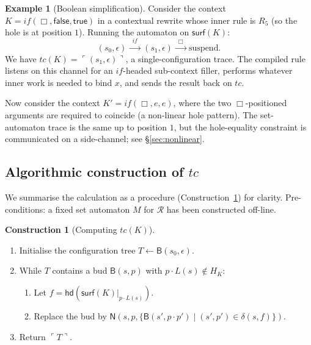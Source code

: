 \documentclass[11pt]{article}
\theoremstyle{plain}
\theoremstyle{definition}
\newtheorem{example}[theorem]{Example}
\newtheorem{construction}[theorem]{Construction}
\theoremstyle{remark}
\newcommand{\reflect}[1]{\ulcorner #1 \urcorner}
\newcommand{\hd}{\mathsf{hd}}
\newcommand{\surface}{\mathsf{surf}}
\newcommand{\true}{\mathsf{true}}
\newcommand{\false}{\mathsf{false}}
\begin{document}
\begin{example}[Boolean simplification]
\par\medskip\noindent
Consider the context $K = \mathit{if}(\Box, \false, \true)$ in a
contextual rewrite whose inner rule is $R_{5}$ (so the hole is at position
$1$). Running the automaton on $\surface(K)$:
\[
  (s_{0}, \epsilon) \xrightarrow{\;\;\mathit{if}\;\;}
  (s_{1}, \epsilon) \xrightarrow{\;\;\Box\;\;}
  \text{suspend}.
\]
We have $tc(K) = \reflect{(s_{1}, \epsilon)}$, a single-configuration trace.
The compiled rule listens on this channel for an $\mathit{if}$-headed
sub-context filler, performs whatever inner work is needed to bind $x$, and
sends the result back on $tc$.
\par\medskip\noindent
Now consider the context $K' = \mathit{if}(\Box, e, e)$, where the two
$\Box$-positioned arguments are required to coincide (a non-linear hole
pattern). The set-automaton trace is the same up to position $1$, but the
hole-equality constraint is communicated on a side-channel; see
\S\ref{sec:nonlinear}.
\end{example}

\subsection{Algorithmic construction of $tc$}\label{ssec:algorithm}

We summarise the calculation as a procedure (Construction~\ref{constr:tc}) for
clarity. Pre-conditions: a fixed set automaton $M$ for $\mathcal{R}$ has
been constructed off-line.

\begin{construction}[Computing $tc(K)$]\label{constr:tc}\rm
\begin{enumerate}[leftmargin=2em,label=\arabic*.]
  \item Initialise the configuration tree $T \gets \mathsf{B}(s_{0}, \epsilon)$.
  \item While $T$ contains a bud $\mathsf{B}(s, p)$ with
        $p \cdot L(s) \notin H_{K}$:
    \begin{enumerate}[label=2.\arabic*]
      \item Let $f = \hd(\surface(K)|_{p \cdot L(s)})$.
      \item Replace the bud by
            $\mathsf{N}(s, p, \{\mathsf{B}(s', p \cdot p') \mid (s', p') \in \delta(s, f)\})$.
    \end{enumerate}
  \item Return $\reflect{T}$.
\end{enumerate}
\end{construction}
\end{document}
